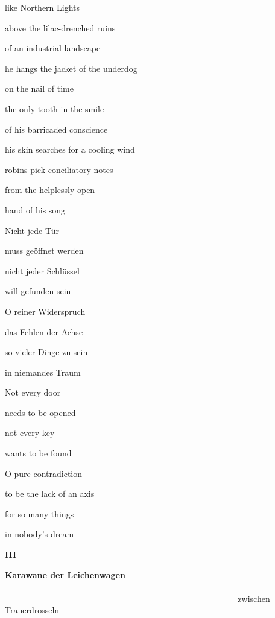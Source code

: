 like Northern Lights

above the lilac-drenched ruins

of an industrial landscape


\bigskip

he hangs the jacket of the underdog

on the nail of time

the only tooth in the smile

of his barricaded conscience


\bigskip

his skin searches for a cooling wind

robins pick conciliatory notes

from the helplessly open

hand of his song


\bigskip



\bigskip

Nicht jede Tür

muss geöffnet werden

nicht jeder Schlüssel

will gefunden sein


\bigskip

O reiner Widerspruch

das Fehlen der Achse 

so vieler Dinge zu sein

in niemandes Traum


\bigskip



\bigskip

Not every door

needs to be opened

not every key

wants to be found


\bigskip

O pure contradiction

to be the lack of an axis

for so many things

in nobody's dream

\clearpage
\bigskip

{\bfseries
III}

\clearpage
\textbf{Karawane der Leichenwagen
\ \ \ \ \ \ \ \ \ \ \ \ \ \ \ \ \ \ \ \ \ \ \ \ \ \ \ \ \ \ \ \ \ \ \ \ \ \ \ \ \ \ \ \ \ \ \ \ \ \ \ \ \ \ \ \ \ \ \ \ \ \ \ \ \ \ \ \ \ \ \ \ \ \ \ \ \ \ \ \ \ \ \ \ \ \ \ \ \ \ \ \ \ \ \ \ \ \ \ \ \ \ \ \ \ \ \ \ \ \ }zwischen
Trauerdrosseln

